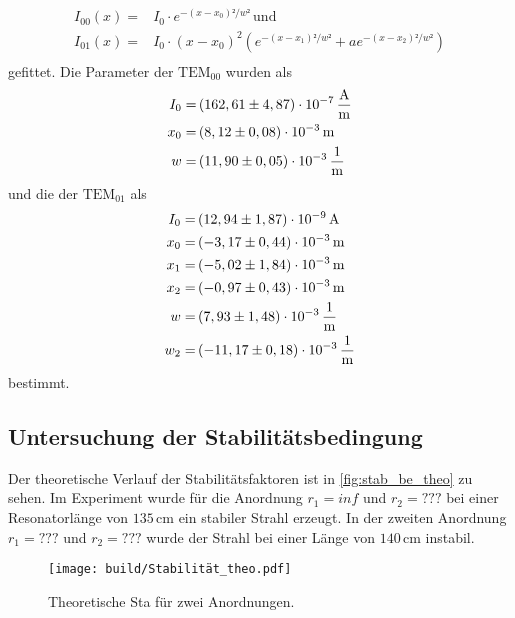 \begin{align*}
    I_{00}(x) =& I_0 \cdot e^{-(x-x_0)²/w ²} \, \text{und} \\
    I_{01}(x) =& I_0 \cdot (x-x_{0})^2 \left( e^{-(x-x_1)²/w ²} + a e^{-(x-x_2)²/w ²} \right) \\
\end{align*}
gefittet.
Die Parameter der $\text{TEM}_{00}$  wurden als 
\begin{align*}
   I_0 =& \left( 162,61 \pm 4,87 \right) \cdot 10^{-7} \, \dfrac{\unit{\ampere}}{\unit{\meter}} \\
   x_0 =& \left( 8,12   \pm 0,08 \right) \cdot 10^{-3} \, \unit{\meter}                         \\
   w   =& \left(11,90   \pm 0,05 \right) \cdot 10^{-3} \, \unit{\dfrac{1}{\meter}}              \\
\end{align*}
und die der $\text{TEM}_{01}$ als
\begin{align*}
    I_0 =& \left( 12,94  \pm 1,87 \right) \cdot 10^{-9} \, \unit{\ampere}           \\
    x_0 =& \left( -3,17  \pm 0,44 \right) \cdot 10^{-3} \, \unit{\meter}            \\
    x_1 =& \left( -5,02  \pm 1,84 \right) \cdot 10^{-3} \, \unit{\meter}            \\
    x_2 =& \left( -0,97  \pm 0,43 \right) \cdot 10^{-3} \, \unit{\meter}            \\
    w   =& \left(  7,93  \pm 1,48 \right) \cdot 10^{-3} \, \unit{\dfrac{1}{\meter}} \\
    w_2 =& \left(-11,17  \pm 0,18 \right) \cdot 10^{-3} \, \unit{\dfrac{1}{\meter}} \\
 \end{align*}
 bestimmt.

 \subsection{Untersuchung der Stabilitätsbedingung}
 \label{sec:Stab_be}
Der theoretische Verlauf der Stabilitätsfaktoren ist in \autoref{fig:stab_be_theo} zu sehen.
Im Experiment wurde für die Anordnung $r_1 = inf$ und $r_2 = ???$ bei einer Resonatorlänge von $135 \, \unit{\centi\meter}$ ein stabiler Strahl erzeugt.
In der zweiten Anordnung $r_1 = ???$ und $r_2 = ???$ wurde der Strahl bei einer Länge von $140 \, \unit{\centi\meter}$ instabil.
 \begin{figure}[H]
    \centering
    \texttt{[image: build/Stabilität\_theo.pdf]}
    \caption{Theoretische Sta für zwei Anordnungen.}
    \label{fig:stab_be_theo}
\end{figure}